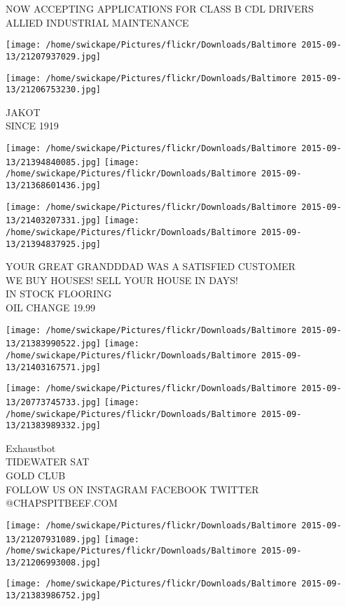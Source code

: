 \documentclass[10pt,letterpaper]{article}
\begin{document}
NOW ACCEPTING APPLICATIONS FOR CLASS B CDL DRIVERS\\
ALLIED INDUSTRIAL MAINTENANCE
\pagebreak

\texttt{[image: /home/swickape/Pictures/flickr/Downloads/Baltimore 2015-09-13/21207937029.jpg]}

\vspace{0.25in}
\texttt{[image: /home/swickape/Pictures/flickr/Downloads/Baltimore 2015-09-13/21206753230.jpg]}

JAKOT\\
SINCE 1919
\pagebreak

\texttt{[image: /home/swickape/Pictures/flickr/Downloads/Baltimore 2015-09-13/21394840085.jpg]}
\texttt{[image: /home/swickape/Pictures/flickr/Downloads/Baltimore 2015-09-13/21368601436.jpg]}

\texttt{[image: /home/swickape/Pictures/flickr/Downloads/Baltimore 2015-09-13/21403207331.jpg]}
\texttt{[image: /home/swickape/Pictures/flickr/Downloads/Baltimore 2015-09-13/21394837925.jpg]}

YOUR GREAT GRANDDDAD WAS A SATISFIED CUSTOMER\\
WE BUY HOUSES!  SELL YOUR HOUSE IN DAYS!\\
IN STOCK FLOORING\\
OIL CHANGE 19.99
\pagebreak

\texttt{[image: /home/swickape/Pictures/flickr/Downloads/Baltimore 2015-09-13/21383990522.jpg]}
\texttt{[image: /home/swickape/Pictures/flickr/Downloads/Baltimore 2015-09-13/21403167571.jpg]}

\texttt{[image: /home/swickape/Pictures/flickr/Downloads/Baltimore 2015-09-13/20773745733.jpg]}
\texttt{[image: /home/swickape/Pictures/flickr/Downloads/Baltimore 2015-09-13/21383989332.jpg]}

Exhaustbot\\
TIDEWATER SAT\\
GOLD CLUB\\
FOLLOW US ON INSTAGRAM FACEBOOK TWITTER @CHAPSPITBEEF.COM
\pagebreak

\texttt{[image: /home/swickape/Pictures/flickr/Downloads/Baltimore 2015-09-13/21207931089.jpg]}
\texttt{[image: /home/swickape/Pictures/flickr/Downloads/Baltimore 2015-09-13/21206993008.jpg]}

\vspace{0.25in}
\texttt{[image: /home/swickape/Pictures/flickr/Downloads/Baltimore 2015-09-13/21383986752.jpg]}
\end{document}
